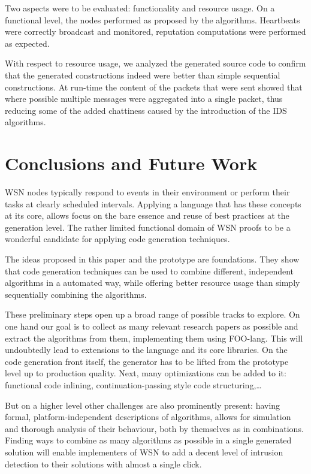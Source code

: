 \documentclass[conference]{IEEEtran}
\begin{document}
Two aspects were to be evaluated: functionality and resource usage. On a
functional level, the nodes performed as proposed by the algorithms. Heartbeats
were correctly broadcast and monitored, reputation computations were performed
as expected.

With respect to resource usage, we analyzed the generated source code to
confirm that the generated constructions indeed were better than simple
sequential constructions. At run-time the content of the packets that were sent
showed that where possible multiple messages were aggregated into a single
packet, thus reducing some of the added chattiness caused by the introduction
of the IDS algorithms.

\section{Conclusions and Future Work}
\label{section:conclusions}

WSN nodes typically respond to events in their environment or perform their
tasks at clearly scheduled intervals. Applying a language that has these
concepts at its core, allows focus on the bare essence and reuse of best
practices at the generation level. The rather limited functional domain of WSN
proofs to be a wonderful candidate for applying code generation techniques.

The ideas proposed in this paper and the prototype are foundations. They show
that code generation techniques can be used to combine different, independent
algorithms in a automated way, while offering better resource usage than simply
sequentially combining the algorithms.

These preliminary steps open up a broad range of possible tracks to explore. On
one hand our goal is to collect as many relevant research papers as possible
and extract the algorithms from them, implementing them using FOO-lang. This
will undoubtedly lead to extensions to the language and its core libraries. On
the code generation front itself, the generator has to be lifted from the
prototype level up to production quality. Next, many optimizations can be added
to it: functional code inlining, continuation-passing style code
structuring,\dots

But on a higher level other challenges are also prominently present: having
formal, platform-independent descriptions of algorithms, allows for simulation
and thorough analysis of their behaviour, both by themselves as in
combinations. Finding ways to combine as many algorithms as possible in a
single generated solution will enable implementers of WSN to add a decent level
of intrusion detection to their solutions with almost a single click.
\end{document}
